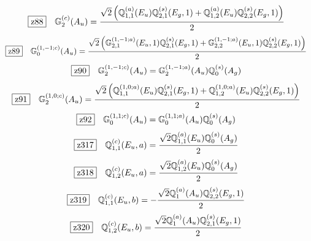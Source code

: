 \documentclass[fleqn,10pt,landscape]{jsarticle}
\begin{document}
\begin{dmath*}
\hspace*{3mm}\fbox{z88}\quad \mathbb{G}_{2}^{(c)}(A_{u})=\frac{\sqrt{2} \left(\mathbb{Q}_{1,1}^{(a)}(E_{u}) \mathbb{Q}_{2,1}^{(s)}(E_{g},1) + \mathbb{Q}_{1,2}^{(a)}(E_{u}) \mathbb{Q}_{2,2}^{(s)}(E_{g},1)\right)}{2}
\end{dmath*}
\begin{dmath*}
\hspace*{3mm}\fbox{z89}\quad \mathbb{G}_{0}^{(1,-1;c)}(A_{u})=\frac{\sqrt{2} \left(\mathbb{G}_{2,1}^{(1,-1;a)}(E_{u},1) \mathbb{Q}_{2,1}^{(s)}(E_{g},1) + \mathbb{G}_{2,2}^{(1,-1;a)}(E_{u},1) \mathbb{Q}_{2,2}^{(s)}(E_{g},1)\right)}{2}
\end{dmath*}
\begin{dmath*}
\hspace*{3mm}\fbox{z90}\quad \mathbb{G}_{2}^{(1,-1;c)}(A_{u})=\mathbb{G}_{2}^{(1,-1;a)}(A_{u}) \mathbb{Q}_{0}^{(s)}(A_{g})
\end{dmath*}
\begin{dmath*}
\hspace*{3mm}\fbox{z91}\quad \mathbb{G}_{2}^{(1,0;c)}(A_{u})=\frac{\sqrt{2} \left(\mathbb{Q}_{1,1}^{(1,0;a)}(E_{u}) \mathbb{Q}_{2,1}^{(s)}(E_{g},1) + \mathbb{Q}_{1,2}^{(1,0;a)}(E_{u}) \mathbb{Q}_{2,2}^{(s)}(E_{g},1)\right)}{2}
\end{dmath*}
\begin{dmath*}
\hspace*{3mm}\fbox{z92}\quad \mathbb{G}_{0}^{(1,1;c)}(A_{u})=\mathbb{G}_{0}^{(1,1;a)}(A_{u}) \mathbb{Q}_{0}^{(s)}(A_{g})
\end{dmath*}
\begin{dmath*}
\hspace*{3mm}\fbox{z317}\quad \mathbb{Q}_{1,1}^{(c)}(E_{u},a)=\frac{\sqrt{2} \mathbb{Q}_{1,1}^{(a)}(E_{u}) \mathbb{Q}_{0}^{(s)}(A_{g})}{2}
\end{dmath*}
\begin{dmath*}
\hspace*{3mm}\fbox{z318}\quad \mathbb{Q}_{1,2}^{(c)}(E_{u},a)=\frac{\sqrt{2} \mathbb{Q}_{1,2}^{(a)}(E_{u}) \mathbb{Q}_{0}^{(s)}(A_{g})}{2}
\end{dmath*}
\begin{dmath*}
\hspace*{3mm}\fbox{z319}\quad \mathbb{Q}_{1,1}^{(c)}(E_{u},b)=- \frac{\sqrt{2} \mathbb{Q}_{1}^{(a)}(A_{u}) \mathbb{Q}_{2,2}^{(s)}(E_{g},1)}{2}
\end{dmath*}
\begin{dmath*}
\hspace*{3mm}\fbox{z320}\quad \mathbb{Q}_{1,2}^{(c)}(E_{u},b)=\frac{\sqrt{2} \mathbb{Q}_{1}^{(a)}(A_{u}) \mathbb{Q}_{2,1}^{(s)}(E_{g},1)}{2}
\end{dmath*}
\end{document}
